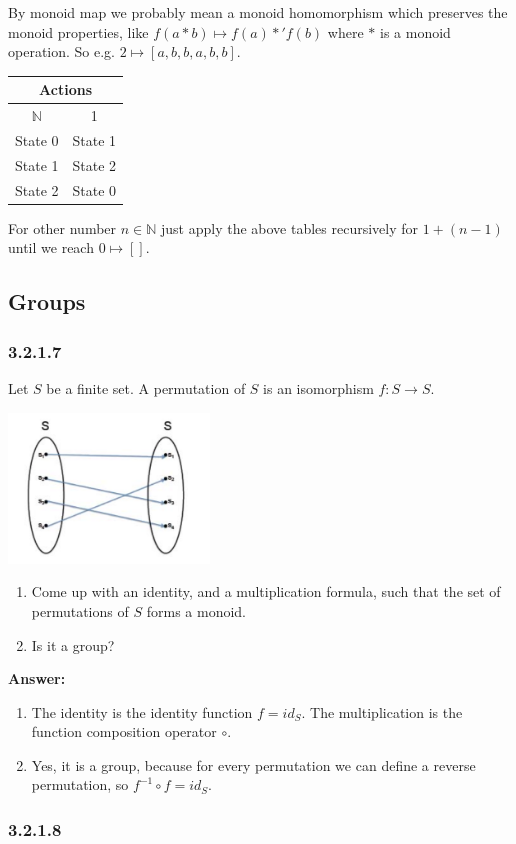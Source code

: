 \documentclass{article}
\newcommand{\N}{\mathbb{N}}
\newcommand{\vsp}[0]{\vspace*{10pt}\par}
\newcommand{\exercise}[1]{\subsubsection*{#1}}
\newcommand{\ans}[0]{\vsp\textbf{Answer: }\vsp}
\newcommand{\ei}{\item}
\newcommand{\es}{\begin{enumerate}[label=(\alph*)]\ei}
\newcommand{\ee}{\end{enumerate}}
\begin{document}
By monoid map we probably mean a monoid homomorphism which preserves the monoid
properties, like $f(a * b) \mapsto f(a) *' f(b)$ where $*$ is a monoid
operation. So e.g.  $2 \mapsto [a, b, b, a, b, b]$.

\begin{center}
\begin{tabular}{|c||c|}
\hline
\multicolumn{2}{|c|}{Actions} \\
\hline
$\N$ & 1 \\
\hline
State 0& State 1\\
\hline
State 1& State 2\\
\hline
State 2& State 0\\
\hline
\end{tabular}
\end{center}

For other number $n \in \N$ just apply the above tables recursively for $1 +
(n-1)$ until we reach $0 \mapsto []$.

\subsection{Groups}

\exercise{3.2.1.7}

Let \( S \) be a finite set. A permutation of \( S \) is an isomorphism \( f : S
\to S \).

\begin{center}
\includegraphics[width=0.4\textwidth]{img/ex3217.png}
\end{center}

\es Come up with an identity, and a multiplication formula, such that the set of
    permutations of \( S \) forms a monoid.
\ei Is it a group?
\ee

\ans

\es The identity is the identity function $f = id_S$. The multiplication is the
    function composition operator $\circ$.
\ei Yes, it is a group, because for every permutation we can define a reverse
    permutation, so $f^{-1} \circ f = id_S$.
\ee

\exercise{3.2.1.8}
\end{document}
